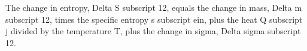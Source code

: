 The change in entropy, Delta S subscript 12, equals the change in mass, Delta m subscript 12, times the specific entropy s subscript ein, plus the heat Q subscript j divided by the temperature T, plus the change in sigma, Delta sigma subscript 12.